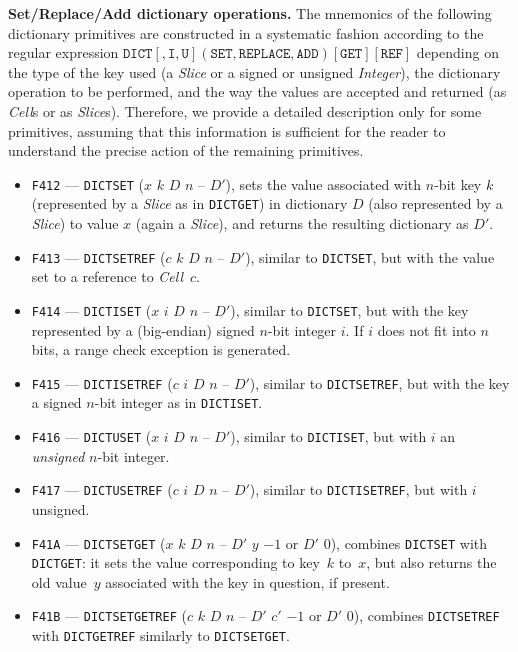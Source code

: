 \documentclass[12pt,oneside]{article}
\def\makepoint#1{\medbreak\noindent{\bf #1.\ }}
\def\nxsubpoint{\refstepcounter{subsubsection}%
  \smallbreak\makepoint{\thesubsubsection}}
\def\emb#1{\textbf{#1.}}
\begin{document}
\nxsubpoint\label{sp:prim.dict.set}\emb{{\sc Set}/{\sc Replace}/{\sc Add} dictionary operations}
The mnemonics of the following dictionary primitives are constructed in a systematic fashion according to the regular expression $\texttt{DICT}[,\texttt{I},\texttt{U}](\texttt{SET},\texttt{REPLACE},\texttt{ADD})[\texttt{GET}][\texttt{REF}]$ depending on the type of the key used (a {\em Slice\/} or a signed or unsigned {\em Integer\/}), the dictionary operation to be performed, and the way the values are accepted and returned (as {\em Cell\/}s or as {\em Slice\/}s). Therefore, we provide a detailed description only for some primitives, assuming that this information is sufficient for the reader to understand the precise action of the remaining primitives.
\begin{itemize}
\item {\tt F412} --- {\tt DICTSET} ($x$ $k$ $D$ $n$ -- $D'$), sets the value associated with $n$-bit key $k$ (represented by a {\em Slice} as in {\tt DICTGET}) in dictionary $D$ (also represented by a {\em Slice}) to value $x$ (again a {\em Slice}), and returns the resulting dictionary as $D'$.
\item {\tt F413} --- {\tt DICTSETREF} ($c$ $k$ $D$ $n$ -- $D'$), similar to {\tt DICTSET}, but with the value set to a reference to {\em Cell}~$c$.
\item {\tt F414} --- {\tt DICTISET} ($x$ $i$ $D$ $n$ -- $D'$), similar to {\tt DICTSET}, but with the key represented by a (big-endian) signed $n$-bit integer $i$. If $i$ does not fit into $n$ bits, a range check exception is generated.
\item {\tt F415} --- {\tt DICTISETREF} ($c$ $i$ $D$ $n$ -- $D'$), similar to {\tt DICTSETREF}, but with the key a signed $n$-bit integer as in {\tt DICTISET}.
\item {\tt F416} --- {\tt DICTUSET} ($x$ $i$ $D$ $n$ -- $D'$), similar to {\tt DICTISET}, but with $i$ an {\em unsigned\/} $n$-bit integer.
\item {\tt F417} --- {\tt DICTUSETREF} ($c$ $i$ $D$ $n$ -- $D'$), similar to {\tt DICTISETREF}, but with $i$ unsigned.
\item {\tt F41A} --- {\tt DICTSETGET} ($x$ $k$ $D$ $n$ -- $D'$ $y$ $-1$ or $D'$ $0$), combines {\tt DICTSET} with {\tt DICTGET}: it sets the value corresponding to key~$k$ to~$x$, but also returns the old value~$y$ associated with the key in question, if present.
\item {\tt F41B} --- {\tt DICTSETGETREF} ($c$ $k$ $D$ $n$ -- $D'$ $c'$ $-1$ or $D'$ $0$), combines {\tt DICTSETREF} with {\tt DICTGETREF} similarly to {\tt DICTSETGET}.

\end{itemize}
\end{document}
